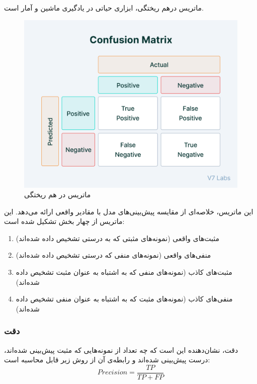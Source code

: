  ماتریس درهم‌ ریختگی، ابزاری حیاتی در یادگیری ماشین و آمار است. \begin{figure}[h!]
    \centering
    \includegraphics[width=0.75\linewidth]{figures/Confusion_Matrix.png}
    \caption{ماتریس در هم‌ ریختگی \cite{V7:mAP_Explanation}}
    \label{fig:confusion_matrix}
\end{figure}این ماتریس، خلاصه‌ای از مقایسه‌ پیش‌بینی‌های مدل با مقادیر واقعی ارائه می‌دهد. این ماتریس از چهار بخش تشکیل شده است:
 \begin{enumerate}
     \item مثبت‌های واقعی (نمونه‌های مثبتی که به درستی تشخیص داده شده‌اند)
     \item منفی‌های واقعی (نمونه‌های منفی که درستی تشخیص داده شده‌اند)
     \item مثبت‌های کاذب (نمونه‌های منفی‌ که به اشتباه به عنوان مثبت تشخیص داده شده‌اند)
     \item منفی‌های کاذب (نمونه‌های مثبت که به اشتباه به عنوان منفی تشخیص داده شده‌اند)
 \end{enumerate}

\subsubsection{دقت}
دقت، نشان‌دهنده این است که چه تعداد از نمونه‌هایی که مثبت پیش‌بینی شده‌اند، درست پیش‌بینی شده‌اند و رابطه‌ی آن از روش زیر قابل محاسبه است:
\begin{equation}
    Precision = \dfrac{TP}{TP+FP}
\end{equation}

